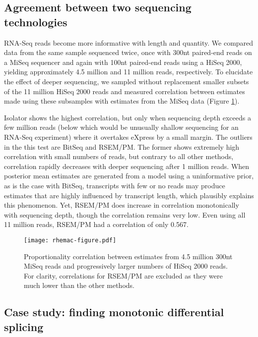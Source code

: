 \documentclass[twocolumn]{article}
\begin{document}
\subsection{Agreement between two sequencing
technologies}\label{agreement-between-two-sequencing-technologies}

RNA-Seq reads become more informative with length and quantity. We
compared data from the same sample sequenced twice, once with 300nt
paired-end reads on a MiSeq sequencer and again with 100nt paired-end
reads using a HiSeq 2000, yielding approximately 4.5 million and 11
million reads, respectively. To elucidate the effect of deeper
sequencing, we sampled without replacement smaller subsets of the 11
million HiSeq 2000 reads and measured correlation between estimates made using
these subsamples with estimates from the MiSeq data (Figure \ref{fig:rhemac}).

Isolator shows the highest correlation, but only when sequencing depth
exceeds a few million reads (below which would be unusually shallow
sequencing for an RNA-Seq experiment) where it overtakes eXpress by a small
margin. The outliers in the this test are BitSeq and RSEM/PM. The former
shows extremely high correlation with small numbers of reads, but
contrary to all other methods, correlation rapidly decreases with deeper
sequencing after 1 million reads. When posterior mean estimates are
generated from a model using a uninformative prior, as is the case with
BitSeq, transcripts with few or no reads may produce estimates that are
highly influenced by transcript length, which plausibly explains this
phenomenon. Yet, RSEM/PM does increase in correlation monotonically with
sequencing depth, though the correlation remains very low. Even using
all 11 million reads, RSEM/PM had a correlation of only 0.567.

\begin{figure}
\texttt{[image: rhemac-figure.pdf]}
\caption{Proportionality correlation between estimates from 4.5 million 300nt
MiSeq reads and progressively larger numbers of HiSeq 2000 reads. For clarity,
correlations for RSEM/PM are excluded as they were much lower than the other
methods.}
\label{fig:rhemac}
\end{figure}

\subsection{Case study: finding monotonic differential splicing}\label{finding-monotonic-differential-splicing}
\end{document}
